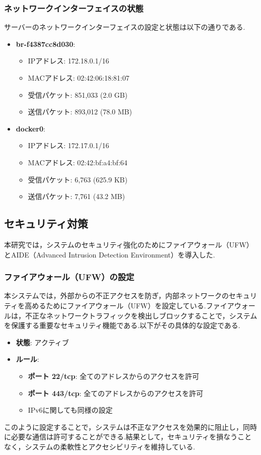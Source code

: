 \documentclass[b5paper,12pt,dvipdfmx]{jsreport}
\begin{document}
\subsubsection{ネットワークインターフェイスの状態}
サーバーのネットワークインターフェイスの設定と状態は以下の通りである.
\begin{itemize}
    \item \textbf{br-f4387cc8d030}:
    \begin{itemize}
        \item IPアドレス: 172.18.0.1/16
        \item MACアドレス: 02:42:06:18:81:07
        \item 受信パケット: 851,033 (2.0 GB)
        \item 送信パケット: 893,012 (78.0 MB)
    \end{itemize}

    \item \textbf{docker0}:
    \begin{itemize}
        \item IPアドレス: 172.17.0.1/16
        \item MACアドレス: 02:42:bf:a4:bf:64
        \item 受信パケット: 6,763 (625.9 KB)
        \item 送信パケット: 7,761 (43.2 MB)
    \end{itemize}
\end{itemize}

\subsection{セキュリティ対策}

本研究では，システムのセキュリティ強化のためにファイアウォール（UFW）とAIDE（Advanced Intrusion Detection Environment）を導入した.

\subsubsection{ファイアウォール（UFW）の設定}
本システムでは，外部からの不正アクセスを防ぎ，内部ネットワークのセキュリティを高めるためにファイアウォール（UFW）を設定している.ファイアウォールは，不正なネットワークトラフィックを検出しブロックすることで，システムを保護する重要なセキュリティ機能である.以下がその具体的な設定である.

\begin{itemize}
    \item \textbf{状態}: アクティブ
    \item \textbf{ルール}:
    \begin{itemize}
        \item \textbf{ポート 22/tcp}: 全てのアドレスからのアクセスを許可
        \item \textbf{ポート 443/tcp}: 全てのアドレスからのアクセスを許可
        \item IPv6に関しても同様の設定
    \end{itemize}
\end{itemize}
このように設定することで，システムは不正なアクセスを効果的に阻止し，同時に必要な通信は許可することができる.結果として，セキュリティを損なうことなく，システムの柔軟性とアクセシビリティを維持している.
\end{document}
